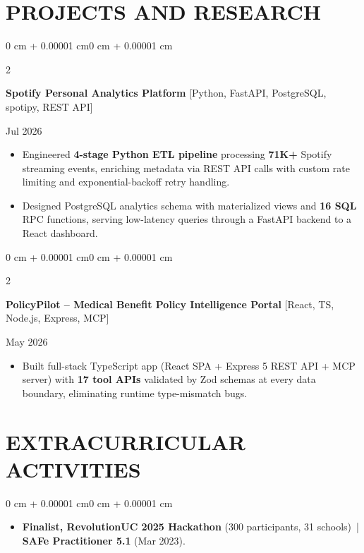 \documentclass[10pt, letterpaper]{article}
\newenvironment{highlights}{
    \begin{itemize}[
        topsep=0.10 cm,
        parsep=0.06 cm,
        partopsep=0pt,
        itemsep=0.06 cm,
        leftmargin=12pt
    ]
}{
    \end{itemize}
}
\newenvironment{onecolentry}{
    \begin{adjustwidth}{0 cm + 0.00001 cm}{0 cm + 0.00001 cm}
}{
    \end{adjustwidth}
}
\newenvironment{twocolentry}[2][]{
    \onecolentry
    \def\secondColumn{#2}
    \setcolumnwidth{\fill, 4.5 cm}
    \begin{paracol}{2}
}{
    \switchcolumn \raggedleft \secondColumn
    \end{paracol}
    \endonecolentry
}
\begin{document}
\section{PROJECTS AND RESEARCH}
\begin{twocolentry}{Jul 2026}
\textbf{Spotify Personal Analytics Platform} [Python, FastAPI, PostgreSQL, spotipy, REST API]
\end{twocolentry}
\begin{highlights}
  \item Engineered \textbf{4-stage Python ETL pipeline} processing \textbf{71K+} Spotify streaming events, enriching metadata via REST API calls with custom rate limiting and exponential-backoff retry handling.
  \item Designed PostgreSQL analytics schema with materialized views and \textbf{16 SQL} RPC functions, serving low-latency queries through a FastAPI backend to a React dashboard.
\end{highlights}

\vspace{0.12 cm}

\begin{twocolentry}{May 2026}
\textbf{PolicyPilot -- Medical Benefit Policy Intelligence Portal} [React, TS, Node.js, Express, MCP]
\end{twocolentry}
\begin{highlights}
  \item Built full-stack TypeScript app (React SPA + Express 5 REST API + MCP server) with \textbf{17 tool APIs} validated by Zod schemas at every data boundary, eliminating runtime type-mismatch bugs.
\end{highlights}

\section{EXTRACURRICULAR ACTIVITIES}
\begin{onecolentry}
\begin{highlights}
  \item \textbf{Finalist, RevolutionUC 2025 Hackathon} (300 participants, 31 schools) \,|\, \textbf{SAFe Practitioner 5.1} (Mar 2023).
\end{highlights}
\end{onecolentry}
\end{document}
